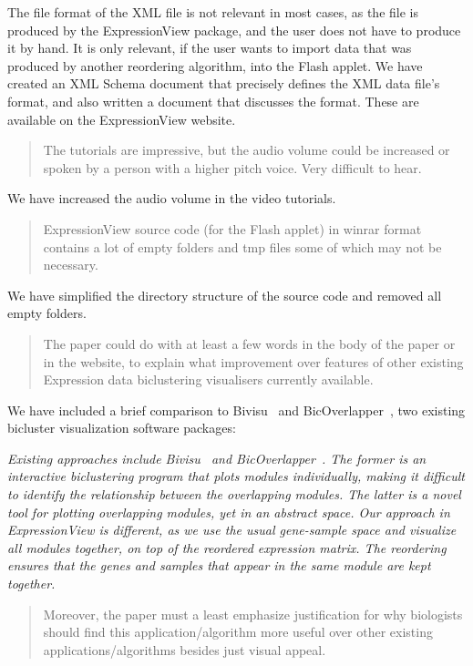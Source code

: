 \documentclass[a4paper]{article}
\newenvironment{myquote}{\begin{quote}\color{blue}}{\end{quote}}
\begin{document}
The file format of the XML file is not relevant in most cases, as the
file is produced by the ExpressionView package, and the user does not
have to produce it by hand. It is only relevant, if the user wants to
import data that was produced by another reordering algorithm, into
the Flash applet. We have created an XML Schema document that precisely
defines the XML data file's format, and also written a document that
discusses the format. These are available on the ExpressionView website.

\begin{myquote}
The tutorials are impressive, but the audio volume could be increased
or spoken by a person with a higher pitch voice. Very difficult to
hear.  
\end{myquote}

We have increased the audio volume in the video tutorials.

\begin{myquote}
ExpressionView source code (for the Flash applet) in winrar
format contains a lot of empty folders and tmp files some of which may
not be necessary. 
\end{myquote}

We have simplified the directory structure of the source code and 
removed all empty folders.

\begin{myquote}
The paper could do with at least a few words in the body of the paper
or in the website, to explain what improvement over features of other
existing Expression data biclustering visualisers currently
available. 
\end{myquote}

We have included a brief comparison to Bivisu~\citep{cheng07} and
BicOverlapper~\citep{santamaria08}, two existing bicluster
visualization software packages:

\textsl{Existing approaches include Bivisu~\citep{cheng07} and
BicOverlapper~\citep{santamaria08}. The former is an interactive
biclustering program that plots modules individually, making it
difficult to identify the relationship between the overlapping
modules. The latter is a novel tool for plotting overlapping modules,
yet in an abstract space. Our approach in ExpressionView is different,
as we use the usual gene-sample space and visualize all modules
together, on top of the reordered expression matrix. The reordering
ensures that the genes and samples that appear in the same module are
kept together.
}

\begin{myquote}
Moreover, the paper must a least emphasize justification
for why biologists should find this application/algorithm more useful
over other existing applications/algorithms besides just visual
appeal. 
\end{myquote}
\end{document}
